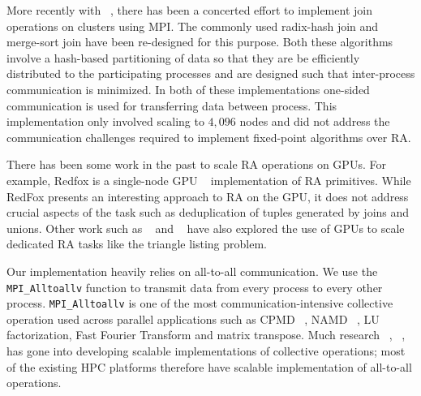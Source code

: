 More recently with ~\cite{Barthels:2017:DJA:3055540.3055545}, there has been a concerted effort to implement join operations on clusters using MPI. The commonly used radix-hash join and merge-sort join have been re-designed for this purpose. Both these algorithms involve a hash-based partitioning of data so that they are be efficiently distributed to the participating processes and are designed such that inter-process communication is minimized. In both of these implementations one-sided communication is used for transferring data between process. This implementation only involved scaling to $4,\!096$ nodes and did not address the communication challenges required to implement fixed-point algorithms over RA.
 
There has been some work in the past to scale RA operations on GPUs. For example,
Redfox is a single-node GPU ~\cite{Wu:2014:RFE:2581122.2544166} implementation of RA primitives. While RedFox presents an interesting approach to RA on the GPU, it does not address crucial aspects of the task such as deduplication of tuples generated by joins and unions. Other work such as ~\cite{Martinez-Angeles:2016:RLG:2932241.2932244} and ~\cite{Zinn:2016:GJA:2884045.2884054} have also explored the use of GPUs to scale dedicated RA tasks like the triangle listing problem.

Our implementation heavily relies on all-to-all communication. We use the \texttt{MPI\_Alltoallv} function to transmit data from every process to every other process.
\texttt{MPI\_Alltoallv} is one of the most communication-intensive collective operation used across parallel applications such as CPMD ~\cite{cpmd-web}, NAMD ~\cite{1592872}, LU factorization, Fast Fourier Transform and matrix transpose.
Much research ~\cite{4536141}, ~\cite{642949}, ~\cite{Thakur:2005:OCC:2747766.2747771} has gone into developing scalable implementations of collective operations; most of the existing HPC platforms therefore have scalable implementation of all-to-all operations. 




